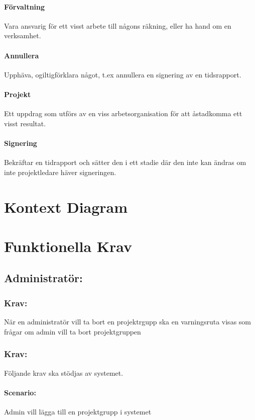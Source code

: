\documentclass[paper=a4, fontsize=11pt,twoside]{article}
\begin{document}
\paragraph{Förvaltning}
Vara ansvarig för ett visst arbete till någons räkning, eller ha hand om en verksamhet.
\paragraph{Annullera}
Upphäva, ogiltigförklara något, t.ex annullera en signering av en tidsrapport.
\paragraph{Projekt}
Ett uppdrag som utförs av en viss arbetsorganisation för att åstadkomma ett visst resultat. 
\paragraph{Signering}
Bekräftar en tidrapport och sätter den i ett stadie där den inte kan ändras om inte projektledare häver signeringen.
\paragraph{}
\section{Kontext Diagram}

\section{Funktionella Krav}

\subsection{Administratör:}
\subsubsection{Krav:}
När en administratör vill ta bort en projektrgupp ska en varningsruta visas som frågar om admin vill ta bort projektgruppen

\subsubsection{Krav:} Följande krav ska stödjas av systemet.
\paragraph{Scenario:}
Admin vill lägga till en projektgrupp i systemet
\end{document}

